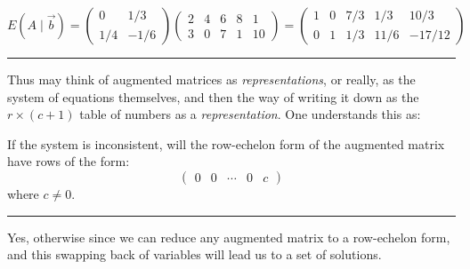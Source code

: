 \begin{remark}
\[
E(A \mid \vec{b}) = \begin{pmatrix} 0 & 1/3 \\ 1/4 & -1/6 \end{pmatrix} \left( \begin{array}{cccc|c} 2 & 4 & 6 & 8 & 1 \\ 3 & 0 & 7 & 1 & 10 \end{array} \right) = \left( \begin{array}{cccc|c} 1 & 0 & 7/3 & 1/3 & 10/3 \\ 0 & 1 & 1/3 & 11/6 & -17/12 \end{array} \right)
\]

\hrule

Thus may think of augmented matrices as \emph{representations}, or really, as the system of equations themselves,
and then the way of writing it down as the $r \times (c+1)$ table of numbers as a
\emph{representation}. One understands this as:

\end{remark}

\begin{question}
If the system is inconsistent, will the row-echelon form of the augmented matrix have rows of the form:
\[
\left(
\begin{array}{cccc|c}
0 & 0 & \cdots & 0 & c
\end{array}
\right)
\]
where $c \neq 0$.

\vspace{1em}
\hrule
\vspace{1em}

Yes, otherwise since we can reduce any augmented matrix to a row-echelon form,
and this swapping back of variables will lead us to a set of solutions.
\end{question}
